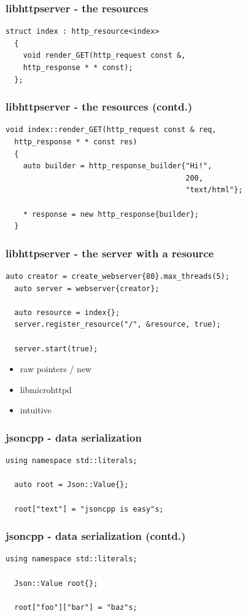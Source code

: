 \begin{frame}[fragile]
  \frametitle{libhttpserver - the resources}
  \begin{lstlisting}[language={[11]C++}]
  struct index : http_resource<index>
  {
    void render_GET(http_request const &,
    http_response * * const);
  };
  \end{lstlisting}
\end{frame}
\begin{frame}[fragile]
  \frametitle{libhttpserver - the resources (contd.)}
  \begin{lstlisting}[language={[11]C++}]
  void index::render_GET(http_request const & req,
  http_response * * const res)
  {
    auto builder = http_response_builder{"Hi!",
                                         200,
                                         "text/html"};

    * response = new http_response{builder};
  }
  \end{lstlisting}
\end{frame}
\begin{frame}[fragile]
  \frametitle{libhttpserver - the server with a resource}
  \begin{lstlisting}[language={[11]C++}]
  auto creator = create_webserver{80}.max_threads(5);
  auto server = webserver{creator};

  auto resource = index{};
  server.register_resource("/", &resource, true);

  server.start(true);
  \end{lstlisting}
\end{frame}
\begin{frame}
  \begin{itemize}
    \item raw pointers / new
    \item libmicrohttpd
    \item intuitive
  \end{itemize}
\end{frame}
\begin{frame}[fragile]
  \frametitle{jsoncpp - data serialization}
  \begin{lstlisting}[language={[11]C++}]
  using namespace std::literals;

  auto root = Json::Value{};

  root["text"] = "jsoncpp is easy"s;
  \end{lstlisting}
\end{frame}
\begin{frame}[fragile]
  \frametitle{jsoncpp - data serialization (contd.)}
  \begin{lstlisting}[language={[11]C++}]
  using namespace std::literals;

  Json::Value root{};

  root["foo"]["bar"] = "baz"s;
  \end{lstlisting}
\end{frame}
